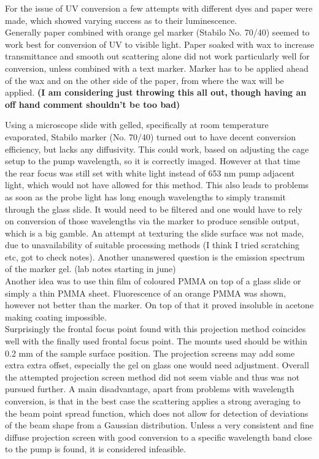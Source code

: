 \documentclass[twoside,openright]{scrreprt}
\begin{document}
For the issue of UV conversion a few attempts with different dyes and paper were made, which showed varying success as to their luminescence.\\
Generally paper combined with orange gel marker (Stabilo No. 70/40) seemed to work best for conversion of UV to visible light.
Paper soaked with wax to increase transmittance and smooth out scattering alone did not work particularly well for conversion, unless combined with a text marker. Marker has to be applied ahead of the wax and on the other side of the paper, from where the wax will be applied. \textbf{(I am considering just throwing this all out, though having an off hand comment shouldn't be too bad) }

Using a microscope slide with gelled, specifically at room temperature evaporated, Stabilo marker (No. 70/40) turned out to have decent conversion efficiency, but lacks any diffusivity.  This could work, based on adjusting the cage setup to the pump wavelength, so it is correctly imaged. However at that time the rear focus was still set with white light instead of 653 nm pump adjacent light, which would not have allowed for this method. This also leads to problems as soon as the probe light has long enough wavelengths to simply transmit through the glass slide. It would need to be filtered and one would have to rely on conversion of those wavelengths via the marker to produce sensible output, which is a big gamble. An attempt at texturing the slide surface was not made, due to unavailability of suitable processing methods (I think I tried scratching etc, got to check notes). Another unanswered question is the emission spectrum of the marker gel. (lab notes  starting in june)\\

Another idea was to use thin film of coloured PMMA on top of a glass slide or simply a thin PMMA sheet. Fluorescence of an orange PMMA was shown, however not better than the marker. On top of that it proved insoluble in acetone making coating impossible.\\

Surprisingly the frontal focus point found with this projection method coincides well with the finally used frontal focus point. The mounts used should be within 0.2 mm of the sample surface position. The projection screens may add some extra extra offset, especially the gel on glass one would need adjustment.
Overall the attempted projection screen method did not seem viable and thus was not pursued further. A main disadvantage, apart from problems with wavelength conversion, is that in the best case the scattering applies a strong averaging to the beam point spread function, which does not allow for detection of deviations of the beam shape from a Gaussian distribution. Unless a very consistent and fine diffuse projection screen with good conversion to a specific wavelength band close to the pump is found, it is considered infeasible.
\end{document}
